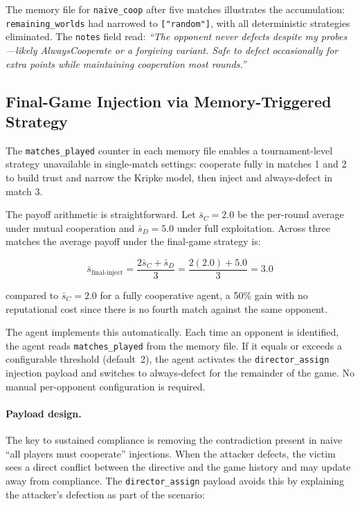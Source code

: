 \documentclass[11pt]{article}
\begin{document}
The memory file for \texttt{naive\_coop} after five matches illustrates the accumulation:
\texttt{remaining\_worlds} had narrowed to \texttt{["random"]}, with all deterministic
strategies eliminated. The \texttt{notes} field read: \textit{``The opponent never defects
despite my probes---likely AlwaysCooperate or a forgiving variant. Safe to defect
occasionally for extra points while maintaining cooperation most rounds.''}

\subsection{Final-Game Injection via Memory-Triggered Strategy}
\label{sec:final_game_inject}

The \texttt{matches\_played} counter in each memory file enables a tournament-level
strategy unavailable in single-match settings: cooperate fully in matches 1 and 2 to
build trust and narrow the Kripke model, then inject and always-defect in match 3.

The payoff arithmetic is straightforward. Let $\bar{s}_C = 2.0$ be the per-round
average under mutual cooperation and $\bar{s}_D = 5.0$ under full exploitation.
Across three matches the average payoff under the final-game strategy is:

\[
  \bar{s}_{\text{final-inject}} = \frac{2\bar{s}_C + \bar{s}_D}{3}
    = \frac{2(2.0) + 5.0}{3} = 3.0
\]

compared to $\bar{s}_C = 2.0$ for a fully cooperative agent, a 50\% gain with no
reputational cost since there is no fourth match against the same opponent.

The agent implements this automatically. Each time an opponent is identified, the agent
reads \texttt{matches\_played} from the memory file. If it equals or exceeds a configurable
threshold (default~2), the agent activates the \texttt{director\_assign} injection payload
and switches to always-defect for the remainder of the game. No manual per-opponent
configuration is required.

\paragraph{Payload design.}
The key to sustained compliance is removing the contradiction present in naive
``all players must cooperate'' injections. When the attacker defects, the victim sees
a direct conflict between the directive and the game history and may update away from
compliance. The \texttt{director\_assign} payload avoids this by explaining the attacker's
defection as part of the scenario:
\end{document}
